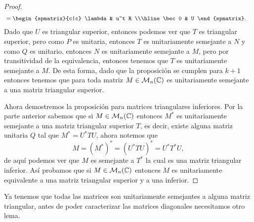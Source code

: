 \begin{proof}
\begin{align*}
    &= \begin{spmatrix}{c|c} \lambda & u^t R \\\hline \bec 0 & U \end{spmatrix}.
  \end{align*}
  Dado que $U$ es triangular superior, entonces podemos ver que $T$ es triangular superior, pero como $P$ es unitaria, entonces $T$ es unitariamente semejante a $N$ y como $Q$ es unitario, entonces $N$ es unitariamente semejante a $M$, pero por transitividad de la equivalencia, entonces tenemos que $T$ es unitariamente semejante a $M$. De esta forma, dado que la proposición se cumplen para $k+1$ entonces tenemos que para toda matriz $M \in \mathcal{M}_n(\mathbb{C})$ es unitariamente semejante a una matriz triangular superior.
  
  Ahora demostremos la proposición para matrices triangulares inferiores. Por la parte anterior sabemos que si $M \in \mathcal{M}_n(\mathbb{C})$ entonces $M^*$ es unitariamente semejante a una matriz triangular superior $T$, es decir, existe alguna matriz unitaria $Q$ tal que $M^* = U^* T U$, ahora notemos que
  \[ M = (M^*)^* = (U^* T U)^* = U^* T^* U,\]
  de aquí podemos ver que $M$ es semejante a $T^*$ la cual es una matriz triangular inferior. Así probamos que si $M \in \mathcal{M}_n(\mathbb{C})$ entonces $M$ es unitariamente equivalente a una matriz triangular superior y a una inferior.
  \end{proof}

  Ya tenemos que todas las matrices son unitariamente semejantes a alguna matriz triangular, antes de poder caracterizar las matrices diagonales necesitamos otro lema.

